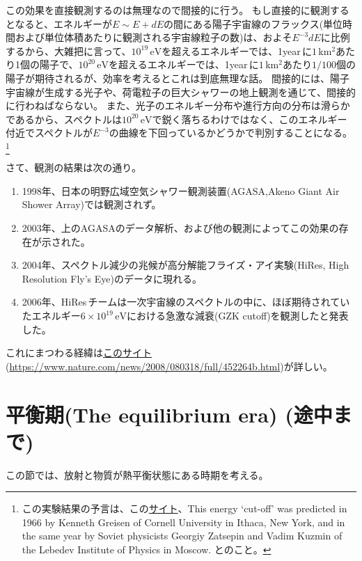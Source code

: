 \documentclass[11pt]{ltjsarticle}
\theoremstyle{plain}
\theoremstyle{break}
\begin{document}
この効果を直接観測するのは無理なので間接的に行う。
もし直接的に観測するとなると、エネルギーが$E\sim E+dE$の間にある陽子宇宙線のフラックス(単位時間および単位体積あたりに観測される宇宙線粒子の数)は、およそ$E^{-3} dE$に比例するから、大雑把に言って、$10^{19}\,\mathrm{eV}$を超えるエネルギーでは、1year\,に$1\,\mathrm{km^2}$あたり1個の陽子で、$10^{20}\,\mathrm{eV}$を超えるエネルギーでは、1year\,に$1\,\mathrm{km^2}$あたり$1/100$個の陽子が期待されるが、効率を考えるとこれは到底無理な話。
間接的には、陽子宇宙線が生成する光子や、荷電粒子の巨大シャワーの地上観測を通じて、間接的に行わねばならない。
また、光子のエネルギー分布や進行方向の分布は滑らかであるから、スペクトルは$10^{20}\,\mathrm{eV}$で鋭く落ちるわけではなく、このエネルギー付近でスペクトルが$E^{-3}$の曲線を下回っているかどうかで判別することになる。
\footnote{この実験結果の予言は、この\href{https://www.nature.com/news/2008/080318/full/452264b.html}{サイト}、This energy ‘cut-off’ was predicted in 1966 by Kenneth Greisen of Cornell University in Ithaca, New York, and in the same year by Soviet physicists Georgiy Zatsepin and Vadim Kuzmin of the Lebedev Institute of Physics in Moscow. とのこと。}

さて、観測の結果は次の通り。
\begin{enumerate}
\item 1998年、日本の明野広域空気シャワー観測装置(AGASA,Akeno Giant Air Shower Array)では観測されず。
\item 2003年、上のAGASAのデータ解析、および他の観測によってこの効果の存在が示された。
\item 2004年、スペクトル減少の兆候が高分解能フライズ・アイ実験(HiRes, High Resolution Fly's Eye)のデータに現れる。
\item 2006年、HiRes\,チームは一次宇宙線のスペクトルの中に、ほぼ期待されていたエネルギー$6\times 10^{19}\,\mathrm{eV}$における急激な減衰(GZK cutoff)を観測したと発表した。
\end{enumerate}%
これにまつわる経緯は\href{https://www.nature.com/news/2008/080318/full/452264b.html}{このサイト}(\url{https://www.nature.com/news/2008/080318/full/452264b.html})が詳しい。

\section{平衡期(The equilibrium era) (途中まで)}
この節では、放射と物質が熱平衡状態にある時期を考える。
\end{document}
